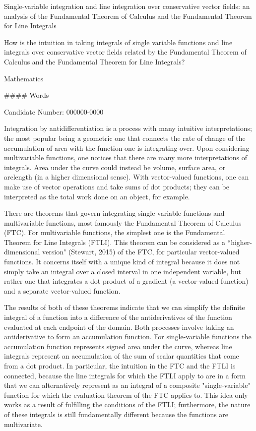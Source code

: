\documentclass[11pt]{article}
\begin{document}
\thispagestyle{firstpage}
\setcounter{page}{1}
\null
\vspace{2.5cm}
\begin{center}

Single-variable integration and line integration over conservative vector fields: an analysis of the Fundamental Theorem of Calculus and the Fundamental Theorem for Line Integrals

How is the intuition in taking integrals of single variable functions and line integrals over conservative vector fields related by the Fundamental Theorem of Calculus and the Fundamental Theorem for Line Integrals?

Mathematics

\#\#\#\# Words

Candidate Number: 000000-0000

\end{center}
\vfill
\pagebreak

Integration by antidifferentiation is a process with many intuitive interpretations; the most popular being a geometric one that connects the rate of change of the accumulation of area with the function one is integrating over. Upon considering multivariable functions, one notices that there are many more interpretations of integrals. Area under the curve could instead be volume, surface area, or arclength (in a higher dimensional sense). With vector-valued functions, one can make use of vector operations and take sums of dot products; they can be interpreted as the total work done on an object, for example.


There are theorems that govern integrating single variable functions and multivariable functions, most famously the Fundamental Theorem of Calculus (FTC). For multivariable functions, the simplest one is the Fundamental Theorem for Line Integrals (FTLI). This theorem can be considered as a “higher-dimensional version" (Stewart, 2015) of the FTC, for particular vector-valued functions. It concerns itself with a unique kind of integral because it does not simply take an integral over a closed interval in one independent variable, but rather one that integrates a dot product of a gradient (a vector-valued function) and a separate vector-valued function.

The results of both of these theorems indicate that we can simplify the definite integral of a function  into a difference of the antiderivatives of the function evaluated at each endpoint of the domain. Both processes involve taking an antiderivative to form an accumulation function. For single-variable functions the accumulation function represents signed area under the curve, whereas line integrals represent an accumulation of the sum of scalar quantities that come from a dot product. In particular, the intuition in the FTC and the FTLI is connected, because the line integrals for which the FTLI apply to are in a form that we can alternatively represent as an integral of a composite "single-variable" function for which the evaluation theorem of the FTC applies to. This idea only works as a result of fulfilling the conditions of the FTLI; furthermore, the nature of these integrals is still fundamentally different because the functions are multivariate. 
\end{document}
